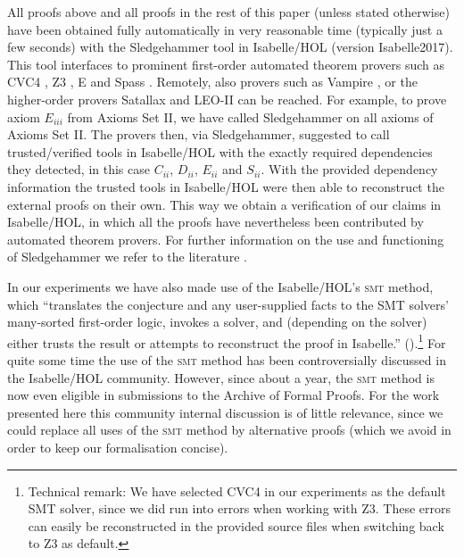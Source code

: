 All proofs above and all proofs in the rest of this paper (unless
stated otherwise) have been obtained fully automatically in very
reasonable time (typically just a few seconds) with the
Sledgehammer tool in Isabelle/HOL (version Isabelle2017). This tool interfaces to prominent
first-order automated theorem provers such as CVC4 \cite{CVC4}, Z3
\cite{Z3}, E \cite{E} and Spass \cite{Spass}.  Remotely, also
  provers such as Vampire \cite{Vampire}, or the higher-order provers
  Satallax \cite{Satallax} and LEO-II \cite{LEO} can be reached. For
  example, to prove axiom $E_{iii}$ from Axioms Set II, we have called
  Sledgehammer on all axioms of Axioms Set II. The provers then, via
  Sledgehammer, suggested to call trusted/verified tools in
  Isabelle/HOL with the exactly required dependencies they
  detected, in this case $C_{ii}$, $D_{ii}$, $E_{ii}$ and $S_{ii}$. With the provided dependency information the trusted tools
  in Isabelle/HOL were then able to reconstruct the external proofs on
  their own.  This way we obtain a verification of our claims in
  Isabelle/HOL, in which all the proofs have nevertheless been
  contributed by automated theorem provers. For further information on
  the use and functioning of Sledgehammer we refer to the 
  literature \cite{Sledgehammer,SledgehammerTutorial}.

  In our experiments we have also made use of the Isabelle/HOL's
  \textsc{smt} method, which ``translates the conjecture and any
  user-supplied facts to the SMT solvers’ many-sorted first-order
  logic, invokes a solver, and (depending on the solver) either trusts
  the result or attempts to reconstruct the proof in Isabelle.''
  (\cite[p.~5]{Sledgehammer}).\footnote{Technical remark: We have
    selected CVC4 in our experiments as the default SMT solver, since
    we did run into errors when working with Z3. These errors can
    easily be reconstructed in the provided source files when
    switching back to Z3 as default.}  For quite some time the use of the \textsc{smt}
  method has been controversially discussed in the Isabelle/HOL
  community. However, since about a year, the \textsc{smt} method is
  now even eligible in submissions to the Archive of Formal
  Proofs. For the work presented here this community internal discussion is 
  of little relevance, since we could replace all uses of the \textsc{smt} method
  by alternative proofs (which we avoid in order to keep
  our formalisation concise).






